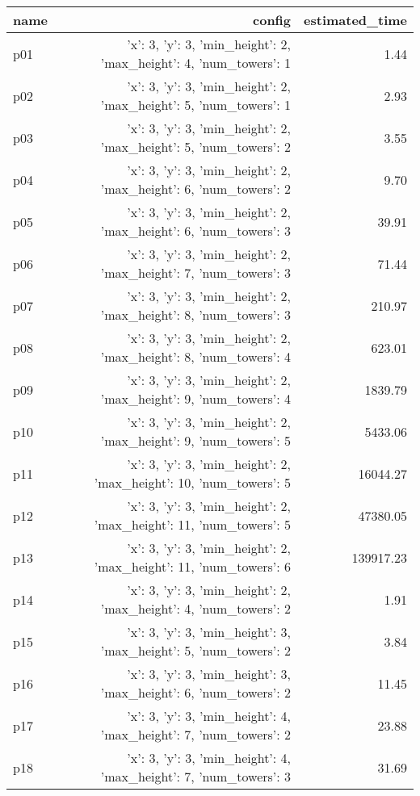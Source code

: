 \documentclass{article}
\begin{document}
                            \begin{center}
                            \scriptsize
                            \begin{tabular}{@{}l|r|r@{}}
                            name & config & estimated\_time\\\midrule
                              p01&{'x': 3, 'y': 3, 'min\_height': 2, 'max\_height': 4, 'num\_towers': 1}&1.44\\
  p02&{'x': 3, 'y': 3, 'min\_height': 2, 'max\_height': 5, 'num\_towers': 1}&2.93\\
  p03&{'x': 3, 'y': 3, 'min\_height': 2, 'max\_height': 5, 'num\_towers': 2}&3.55\\
  p04&{'x': 3, 'y': 3, 'min\_height': 2, 'max\_height': 6, 'num\_towers': 2}&9.70\\
  p05&{'x': 3, 'y': 3, 'min\_height': 2, 'max\_height': 6, 'num\_towers': 3}&39.91\\
  p06&{'x': 3, 'y': 3, 'min\_height': 2, 'max\_height': 7, 'num\_towers': 3}&71.44\\
  p07&{'x': 3, 'y': 3, 'min\_height': 2, 'max\_height': 8, 'num\_towers': 3}&210.97\\
  p08&{'x': 3, 'y': 3, 'min\_height': 2, 'max\_height': 8, 'num\_towers': 4}&623.01\\
  p09&{'x': 3, 'y': 3, 'min\_height': 2, 'max\_height': 9, 'num\_towers': 4}&1839.79\\
  p10&{'x': 3, 'y': 3, 'min\_height': 2, 'max\_height': 9, 'num\_towers': 5}&5433.06\\
  p11&{'x': 3, 'y': 3, 'min\_height': 2, 'max\_height': 10, 'num\_towers': 5}&16044.27\\
  p12&{'x': 3, 'y': 3, 'min\_height': 2, 'max\_height': 11, 'num\_towers': 5}&47380.05\\
  p13&{'x': 3, 'y': 3, 'min\_height': 2, 'max\_height': 11, 'num\_towers': 6}&139917.23\\
  p14&{'x': 3, 'y': 3, 'min\_height': 2, 'max\_height': 4, 'num\_towers': 2}&1.91\\
  p15&{'x': 3, 'y': 3, 'min\_height': 3, 'max\_height': 5, 'num\_towers': 2}&3.84\\
  p16&{'x': 3, 'y': 3, 'min\_height': 3, 'max\_height': 6, 'num\_towers': 2}&11.45\\
  p17&{'x': 3, 'y': 3, 'min\_height': 4, 'max\_height': 7, 'num\_towers': 2}&23.88\\
  p18&{'x': 3, 'y': 3, 'min\_height': 4, 'max\_height': 7, 'num\_towers': 3}&31.69\\

\end{tabular}
\end{center}
\end{document}
